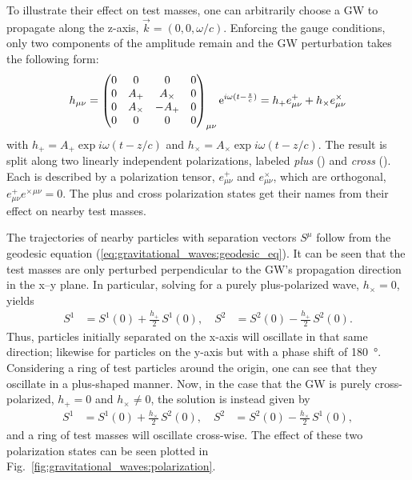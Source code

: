 To illustrate their effect on test masses, one can arbitrarily choose a GW to propagate along the z-axis, $\vec{k}=(0,0,\omega/c)$. Enforcing the gauge conditions, only two components of the amplitude remain and the GW perturbation takes the following form:
\begin{equation}
	h_{\mu\nu} = \begin{pmatrix}
		0 & 0 & 0 & 0 \\
		0 & A_+ & A_\times & 0 \\
		0 & A_\times & -A_+ & 0 \\
		0 & 0 & 0 & 0
	\end{pmatrix}_{\mu\nu} \mathrm{e}^{i\omega(t-\frac{z}{c})} = h_+e_{\mu\nu}^+ + h_\times e_{\mu\nu}^\times
\end{equation}
with $h_+ = A_+\exp i\omega(t-z/c)$ and $h_\times = A_\times\exp i\omega(t-z/c)$.
The result is split along two linearly independent polarizations, labeled \emph{plus} (\text{$+$}) and \emph{cross} (\text{$\times$}). Each is described by a polarization tensor, $e_{\mu\nu}^+$ and $e_{\mu\nu}^\times$, which are orthogonal, $e_{\mu\nu}^+e^\times{}^{\mu\nu} = 0$. The plus and cross polarization states get their names from their effect on nearby test masses.

The trajectories of nearby particles with separation vectors $S^\mu$ follow from the geodesic equation (\ref{eq:gravitational_waves:geodesic_eq}). It can be seen that the test masses are only perturbed perpendicular to the GW's propagation direction in the x--y plane. In particular, solving for a purely plus-polarized wave, $h_\times=0$, yields
\begin{equation}
	\label{eq:gravitational_waves:plus_polarization}
	\begin{aligned}
		S^1 &= S^1(0) + \frac{h_+}{2}\,S^1(0), \quad
		S^2 &= S^2(0) - \frac{h_+}{2}\,S^2(0).
	\end{aligned}
\end{equation}
Thus, particles initially separated on the x-axis will oscillate in that same direction; likewise for particles on the y-axis but with a phase shift of \SI{180}{\degree}. Considering a ring of test particles around the origin, one can see that they oscillate in a plus-shaped manner.
Now, in the case that the GW is purely cross-polarized, $h_+=0$ and $h_\times\neq0$, the solution is instead given by
\begin{equation}
\label{eq:gravitational_waves:cross_polarization}
\begin{aligned}
	S^1 &= S^1(0) + \frac{h_\times}{2}\,S^2(0), \quad
	S^2 &= S^2(0) - \frac{h_\times}{2}\,S^1(0),
\end{aligned}
\end{equation}
and a ring of test masses will oscillate cross-wise.
The effect of these two polarization states can be seen plotted in Fig.~\ref{fig:gravitational_waves:polarization}.

